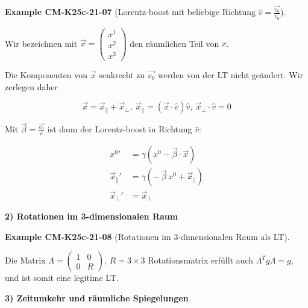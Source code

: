 \documentclass[10pt, letterpaper]{article}
\newcommand{\CustomHeading}[3]{%
  \par\medskip\noindent%
  \textbf{#1 #2} \textnormal{(#3)}.\enskip%
}
\newenvironment{EXA}[2]{\begin{unitbox}\CustomHeading{Example}{#1}{#2}}{\end{unitbox}}
\begin{document}
\begin{EXA}{CM-K25c-21-07}{Lorentz-boost mit beliebige Richtung $\hat{v}=\frac{\vec{v_0}}{v_0}$}
Wir bezeichnen mit $\vec{x}=\begin{pmatrix} x^1 \\ x^2 \\ x^3 \end{pmatrix}$ den räumlichen Teil von $x$.

Die Komponenten von $\vec{x}$ senkrecht zu $\vec{v_0}$ werden von der LT nicht geändert. Wir zerlegen daher

$$\vec{x}=\vec{x}_\parallel + \vec{x}_\perp,\ \vec{x}_\parallel = (\vec{x}\cdot\hat{v})\hat{v},\ \vec{x}_\perp \cdot \hat{v} = 0$$

Mit $\vec{\beta}=\frac{\vec{v_0}}{c}$ ist dann der Lorentz-boost in Richtung $\hat{v}$:

\[
\boxed{
\begin{aligned}
{x^0}'             &= \gamma\!\left(x^0 - \vec{\beta}\cdot\vec{x}\right)\\
\vec{x}_{\parallel}' &= \gamma\!\left(-\,\vec{\beta}\,x^0 + \vec{x}_{\parallel}\right)\\
\vec{x}_{\perp}'     &= \vec{x}_{\perp}
\end{aligned}}
\]
\end{EXA}



\textbf{2) Rotationen im 3-dimensionalen Raum}

\begin{EXA}{CM-K25c-21-08}{Rotationen im 3-dimensionalen Raum als LT}
Die Matrix $\Lambda=\begin{pmatrix} 1 & 0 \\ 0 & R \end{pmatrix}$, $R=3\times3$ Rotationsmatrix erfüllt auch $\Lambda^T g \Lambda = g$, und ist somit eine legitime LT.
\end{EXA}



\textbf{3) Zeitumkehr und räumliche Spiegelungen}
\end{document}
